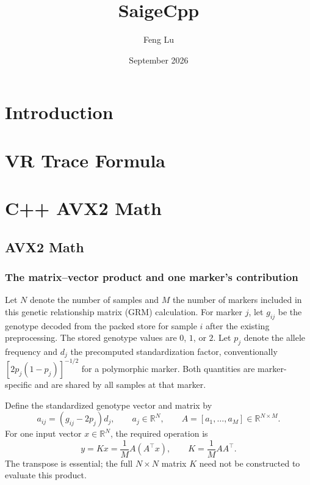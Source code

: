\documentclass{article}
\title{SaigeCpp}
\author{Feng Lu }
\date{September 2026}
\begin{document}
\maketitle

\section{Introduction}

\section{VR Trace Formula}
\section{C++ AVX2 Math}

\subsection{AVX2 Math}
\label{sec:avx2-math}

\subsubsection{The matrix--vector product and one marker's contribution}

Let $N$ denote the number of samples and $M$ the number of markers
included in this genetic relationship matrix (GRM) calculation.
For marker $j$, let $g_{ij}$ be the genotype decoded from the packed
store for sample $i$ after the existing preprocessing.
The stored genotype values are $0$, $1$, or $2$.
Let $p_j$ denote the allele frequency and $d_j$ the precomputed
standardization factor, conventionally $[2p_j(1-p_j)]^{-1/2}$ for a
polymorphic marker. Both quantities are marker-specific and are shared
by all samples at that marker.

Define the standardized genotype vector and matrix by
\begin{equation}
 a_{ij}=(g_{ij}-2p_j)d_j,\qquad
 a_j\in\mathbb{R}^{N},\qquad
 A=[a_1,\ldots,a_M]\in\mathbb{R}^{N\times M}.
\end{equation}
For one input vector $x\in\mathbb{R}^{N}$, the required operation is
\begin{equation}
 \boxed{y=Kx=\frac{1}{M}A(A^\top x)},\qquad
 K=\frac{1}{M}AA^\top.
 \label{eq:avx2-target}
\end{equation}
The transpose is essential; the full $N\times N$ matrix $K$ need not
be constructed to evaluate this product.
\end{document}
